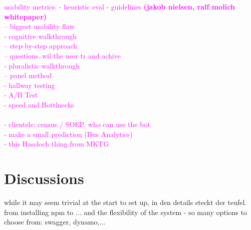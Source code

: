 \textcolor{magenta}{
usability metrics:
- heuristic eval - guidelines \textbf{(jakob nielsen, ralf molich whitepaper)}\\
-- biggest usability flaw\\
- cognitive walkthrough\\
-- step-by-step approach\\
-- questions..wil the user tr and achive\\
- pluralistic walkthrough\\
-- panel method\\
- hallway testing\\
- A/B Test\\
- speed and Bottlnecks\\
\\
- clientele: census / SOEP, who can use the bot\\
- make a small prediction (Bus Analytics)\\
- this Hassloch thing from MKTG\\
}

\section{Discussions}
\label{discussions}



while it may seem trivial at the start to set up, in den details steckt der teufel. from installing npm to ... and the flexibility of the system - so many options to choose from: swagger, dynamo,...



